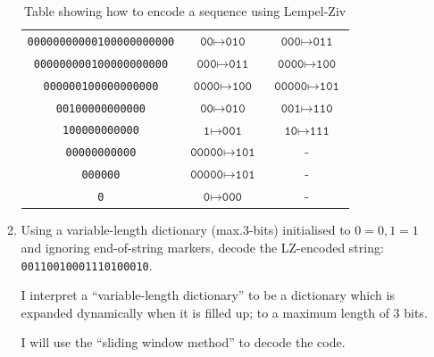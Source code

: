 \documentclass[10pt,\jkfside,a4paper]{article}
\begin{document}
\begin{enumerate}
\begin{enumerate}
\begin{table}[H]
\begin{tabular}{ccc}
                \texttt{00000000000100000000000} & $\texttt{00} \mapsto \texttt{010}$ & $\texttt{000} \mapsto \texttt{011}$ \\

                \texttt{000000000100000000000} & $\texttt{000} \mapsto \texttt{011}$ & $\texttt{0000} \mapsto \texttt{100}$ \\

                \texttt{000000100000000000} & $\texttt{0000} \mapsto \texttt{100}$ & $\texttt{00000} \mapsto \texttt{101}$ \\

                \texttt{00100000000000} & $\texttt{00} \mapsto \texttt{010}$ & $\texttt{001} \mapsto \texttt{110}$ \\

                \texttt{100000000000} & $\texttt{1} \mapsto \texttt{001}$ & $\texttt{10} \mapsto \texttt{111}$ \\

                \texttt{00000000000} & $\texttt{00000} \mapsto \texttt{101}$ & - \\

                \texttt{000000} & $\texttt{00000} \mapsto \texttt{101}$ & - \\

                \texttt{0} & $\texttt{0} \mapsto \texttt{000}$ & - \\

                \bottomrule
            \end{tabular}

            \caption{Table showing how to encode a sequence using Lempel-Ziv}

        \end{table}

        \item Using a variable-length dictionary (max.\@ 3-bits) initialised to $0 = 0, 1 = 1$ and ignoring end-of-string markers, decode the LZ-encoded string: \texttt{00110010001110100010}.

        I interpret a ``variable-length dictionary'' to be a dictionary which is expanded dynamically when it is filled up; to a maximum length of 3 bits.

        I will use the ``sliding window method'' to decode the code.

        \begin{table}[H]

            \centering

            \begin{tabular}{cccc}


\end{tabular}
\end{table}
\end{enumerate}
\end{enumerate}
\end{document}
